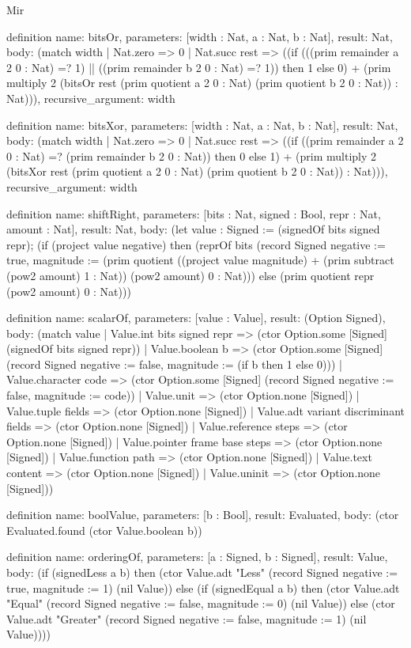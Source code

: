 \begin{lexlean}{Mir}
\begin{semanticmodule}
definition{
  name: bitsOr,
  parameters: [width : Nat, a : Nat, b : Nat],
  result: Nat,
  body: (match width
    | Nat.zero => 0
    | Nat.succ rest => ((if (((prim remainder a 2 0 : Nat) =? 1) || ((prim remainder b 2 0 : Nat) =? 1)) then 1 else 0) + (prim multiply 2 (bitsOr rest (prim quotient a 2 0 : Nat) (prim quotient b 2 0 : Nat)) : Nat))),
  recursive_argument: width
}

definition{
  name: bitsXor,
  parameters: [width : Nat, a : Nat, b : Nat],
  result: Nat,
  body: (match width
    | Nat.zero => 0
    | Nat.succ rest => ((if ((prim remainder a 2 0 : Nat) =? (prim remainder b 2 0 : Nat)) then 0 else 1) + (prim multiply 2 (bitsXor rest (prim quotient a 2 0 : Nat) (prim quotient b 2 0 : Nat)) : Nat))),
  recursive_argument: width
}

definition{
  name: shiftRight,
  parameters: [bits : Nat, signed : Bool, repr : Nat, amount : Nat],
  result: Nat,
  body: (let value : Signed := (signedOf bits signed repr); (if (project value negative) then (reprOf bits (record Signed {negative := true, magnitude := (prim quotient ((project value magnitude) + (prim subtract (pow2 amount) 1 : Nat)) (pow2 amount) 0 : Nat)})) else (prim quotient repr (pow2 amount) 0 : Nat)))
}

definition{
  name: scalarOf,
  parameters: [value : Value],
  result: (Option Signed),
  body: (match value
    | Value.int bits signed repr => (ctor Option.some [Signed] (signedOf bits signed repr))
    | Value.boolean b => (ctor Option.some [Signed] (record Signed {negative := false, magnitude := (if b then 1 else 0)}))
    | Value.character code => (ctor Option.some [Signed] (record Signed {negative := false, magnitude := code}))
    | Value.unit => (ctor Option.none [Signed])
    | Value.tuple fields => (ctor Option.none [Signed])
    | Value.adt variant discriminant fields => (ctor Option.none [Signed])
    | Value.reference steps => (ctor Option.none [Signed])
    | Value.pointer frame base steps => (ctor Option.none [Signed])
    | Value.function path => (ctor Option.none [Signed])
    | Value.text content => (ctor Option.none [Signed])
    | Value.uninit => (ctor Option.none [Signed]))
}

definition{
  name: boolValue,
  parameters: [b : Bool],
  result: Evaluated,
  body: (ctor Evaluated.found (ctor Value.boolean b))
}

definition{
  name: orderingOf,
  parameters: [a : Signed, b : Signed],
  result: Value,
  body: (if (signedLess a b) then (ctor Value.adt "Less" (record Signed {negative := true, magnitude := 1}) (nil Value)) else (if (signedEqual a b) then (ctor Value.adt "Equal" (record Signed {negative := false, magnitude := 0}) (nil Value)) else (ctor Value.adt "Greater" (record Signed {negative := false, magnitude := 1}) (nil Value))))
}


\end{semanticmodule}
\end{lexlean}
